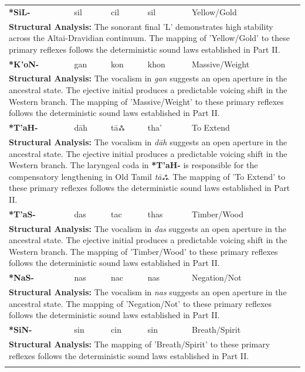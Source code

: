\begin{longtable}{p{} p{} p{} p{} p{}}
\textbf{*SiL-} & sil & cil & sil & Yellow/Gold \\ 
\multicolumn{5}{p{\textwidth}}{\small \textbf{Structural Analysis:} The sonorant final 'L' demonstrates high stability across the Altai-Dravidian continuum. The mapping of 'Yellow/Gold' to these primary reflexes follows the deterministic sound laws established in Part II.} \\ \addlinespace[15pt] 
\textbf{*K'oN-} & gan & kon & khon & Massive/Weight \\ 
\multicolumn{5}{p{\textwidth}}{\small \textbf{Structural Analysis:} The vocalism in \textit{gan} suggests an open aperture in the ancestral state. The ejective initial produces a predictable voicing shift in the Western branch. The mapping of 'Massive/Weight' to these primary reflexes follows the deterministic sound laws established in Part II.} \\ \addlinespace[15pt] 
\textbf{*T'aH-} & dāh & tāஃ & tha' & To Extend \\ 
\multicolumn{5}{p{\textwidth}}{\small \textbf{Structural Analysis:} The vocalism in \textit{dāh} suggests an open aperture in the ancestral state. The ejective initial produces a predictable voicing shift in the Western branch. The laryngeal coda in \textbf{*T'aH-} is responsible for the compensatory lengthening in Old Tamil \textit{tāஃ}. The mapping of 'To Extend' to these primary reflexes follows the deterministic sound laws established in Part II.} \\ \addlinespace[15pt] 
\textbf{*T'aS-} & das & tac & thas & Timber/Wood \\ 
\multicolumn{5}{p{\textwidth}}{\small \textbf{Structural Analysis:} The vocalism in \textit{das} suggests an open aperture in the ancestral state. The ejective initial produces a predictable voicing shift in the Western branch. The mapping of 'Timber/Wood' to these primary reflexes follows the deterministic sound laws established in Part II.} \\ \addlinespace[15pt] 
\textbf{*NaS-} & nas & nac & nas & Negation/Not \\ 
\multicolumn{5}{p{\textwidth}}{\small \textbf{Structural Analysis:} The vocalism in \textit{nas} suggests an open aperture in the ancestral state. The mapping of 'Negation/Not' to these primary reflexes follows the deterministic sound laws established in Part II.} \\ \addlinespace[15pt] 
\textbf{*SiN-} & sin & cin & sin & Breath/Spirit \\ 
\multicolumn{5}{p{\textwidth}}{\small \textbf{Structural Analysis:}  The mapping of 'Breath/Spirit' to these primary reflexes follows the deterministic sound laws established in Part II.} \\ \addlinespace[15pt] 

\end{longtable}
